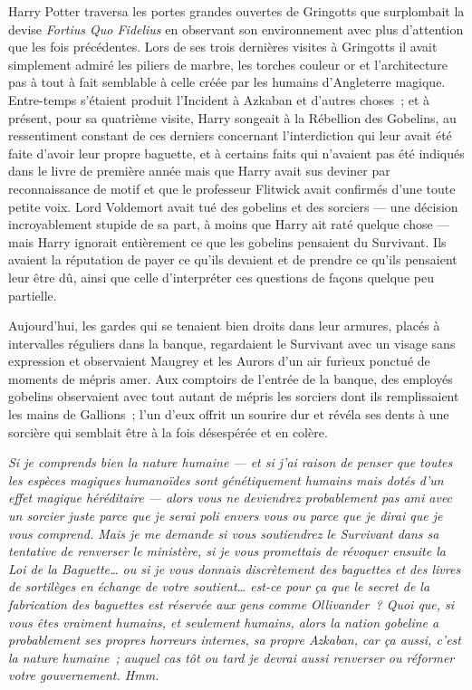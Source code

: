 Harry Potter traversa les portes grandes ouvertes de Gringotts que surplombait la devise \emph{Fortius Quo Fidelius} en observant son environnement avec plus d'attention que les fois précédentes. Lors de ses trois dernières visites à Gringotts il avait simplement admiré les piliers de marbre, les torches couleur or et l'architecture pas à tout à fait semblable à celle créée par les humains d'Angleterre magique. Entre-temps s'étaient produit l'Incident à Azkaban et d'autres choses~; et à présent, pour sa quatrième visite, Harry songeait à la Rébellion des Gobelins, au ressentiment constant de ces derniers concernant l'interdiction qui leur avait été faite d'avoir leur propre baguette, et à certains faits qui n'avaient pas été indiqués dans le livre de première année mais que Harry avait sus deviner par reconnaissance de motif et que le professeur Flitwick avait confirmés d'une toute petite voix. Lord Voldemort avait tué des gobelins et des sorciers — une décision incroyablement stupide de sa part, à moins que Harry ait raté quelque chose — mais Harry ignorait entièrement ce que les gobelins pensaient du Survivant. Ils avaient la réputation de payer ce qu'ils devaient et de prendre ce qu'ils pensaient leur être dû, ainsi que celle d'interpréter ces questions de façons quelque peu partielle.

Aujourd'hui, les gardes qui se tenaient bien droits dans leur armures, placés à intervalles réguliers dans la banque, regardaient le Survivant avec un visage sans expression et observaient Maugrey et les Aurors d'un air furieux ponctué de moments de mépris amer. Aux comptoirs de l'entrée de la banque, des employés gobelins observaient avec tout autant de mépris les sorciers dont ils remplissaient les mains de Gallions~; l'un d'eux offrit un sourire dur et révéla ses dents à une sorcière qui semblait être à la fois désespérée et en colère.

\emph{Si je comprends bien la nature humaine — et si j'ai raison de penser que toutes les espèces magiques humanoïdes sont génétiquement humains mais dotés d'un effet magique héréditaire — alors vous ne deviendrez probablement pas ami avec un sorcier juste parce que je serai poli envers vous ou parce que je dirai que je vous comprend. Mais je me demande si vous soutiendrez le Survivant dans sa tentative de renverser le ministère, si je vous promettais de révoquer ensuite la Loi de la Baguette… ou si je vous donnais discrètement des baguettes et des livres de sortilèges en échange de votre soutient… est-ce pour ça que le secret de la fabrication des baguettes est réservée aux gens comme Ollivander~? Quoi que, si vous êtes vraiment humains, et seulement humains, alors la nation gobeline a probablement ses propres horreurs internes, sa propre Azkaban, car ça aussi, c'est la nature humaine~; auquel cas tôt ou tard je devrai aussi renverser ou réformer votre gouvernement. Hmm.}

